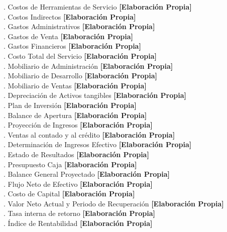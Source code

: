 . Costos de Herramientas de Servicio \textbf{[Elaboración Propia]} \\
. Costos Indirectos \textbf{[Elaboración Propia]} \\
. Gastos Administrativos \textbf{[Elaboración Propia]} \\
. Gastos de Venta \textbf{[Elaboración Propia]} \\
. Gastos Financieros \textbf{[Elaboración Propia]} \\
. Costo Total del Servicio \textbf{[Elaboración Propia]} \\
. Mobiliario de Administración \textbf{[Elaboración Propia]} \\
. Mobiliario de Desarrollo \textbf{[Elaboración Propia]} \\
. Mobiliario de Ventas \textbf{[Elaboración Propia]} \\
. Depreciación de Activos tangibles \textbf{[Elaboración Propia]} \\
. Plan de Inversión \textbf{[Elaboración Propia]} \\
. Balance de Apertura \textbf{[Elaboración Propia]} \\
. Proyección de Ingresos \textbf{[Elaboración Propia]} \\
. Ventas al contado y al crédito \textbf{[Elaboración Propia]} \\
. Determinación de Ingresos Efectivo \textbf{[Elaboración Propia]} \\
. Estado de Resultados \textbf{[Elaboración Propia]} \\
. Presupuesto Caja \textbf{[Elaboración Propia]} \\
. Balance General Proyectado \textbf{[Elaboración Propia]} \\
. Flujo Neto de Efectivo \textbf{[Elaboración Propia]} \\
. Costo de Capital \textbf{[Elaboración Propia]} \\
. Valor Neto Actual y Periodo de Recuperación \textbf{[Elaboración Propia]} \\
. Tasa interna de retorno \textbf{[Elaboración Propia]} \\
. Índice de Rentabilidad \textbf{[Elaboración Propia]} 
